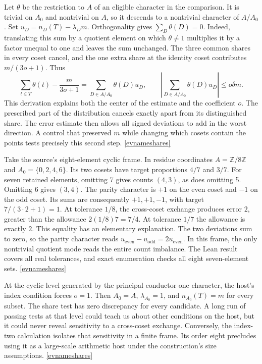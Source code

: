 \documentclass[11pt,letterpaper]{article}
\newcommand{\evref}[1]{\hyperlink{ev-#1}{\textsf{\small[\csname evname#1\endcsname]}}}
\begin{document}
Let \(\theta\) be the restriction to \(A\) of an eligible character in the comparison. It is trivial on \(A_0\) and nontrivial on \(A\), so it descends to a nontrivial character of \(A/A_0\). Set \(u_D=n_D(T)-\lambda_Dm\). Orthogonality gives \(\sum_D\theta(D)=0\). Indeed, translating this sum by a quotient element on which \(\theta\ne1\) multiplies it by a factor unequal to one and leaves the sum unchanged. The three common shares in every coset cancel, and the one extra share at the identity coset contributes \(m/(3o+1)\). Thus
\[
 \sum_{t\in T}\theta(t)-\frac{m}{3o+1}
      =\sum_{D\in A/A_0}\theta(D)u_D,\qquad
 \left|\sum_{D\in A/A_0}\theta(D)u_D\right|\leq o\delta m .
\]
This derivation explains both the center of the estimate and the coefficient \(o\). The prescribed part of the distribution cancels exactly apart from its distinguished share. The error estimate then allows all signed deviations to add in the worst direction. A control that preserved \(m\) while changing which cosets contain the points tests precisely this second step. \evref{shares}

Take the source's eight-element cyclic frame. In residue coordinates \(A=\mathbb Z/8\mathbb Z\) and \(A_0=\{0,2,4,6\}\). Its two cosets have target proportions \(4/7\) and \(3/7\). For seven retained elements, omitting 7 gives counts \((4,3)\), as does omitting 5. Omitting 6 gives \((3,4)\). The parity character is \(+1\) on the even coset and \(-1\) on the odd coset. Its sums are consequently \(+1,+1,-1\), with target \(7/(3\cdot2+1)=1\). At tolerance \(1/8\), the cross-coset exchange produces error \(2\), greater than the allowance \(2(1/8)7=7/4\). At tolerance \(1/7\) the allowance is exactly \(2\). This equality has an elementary explanation. The two deviations sum to zero, so the parity character reads \(u_{\mathrm{even}}-u_{\mathrm{odd}}=2u_{\mathrm{even}}\). In this frame, the only nontrivial quotient mode reads the entire count imbalance. The Lean result covers all real tolerances, and exact enumeration checks all eight seven-element sets. \evref{shares}

At the cyclic level generated by the principal conductor-one character, the host's index condition forces \(o=1\). Then \(A_0=A\), \(\lambda_{A_0}=1\), and \(n_{A_0}(T)=m\) for every subset. The share test has zero discrepancy for every candidate. A long run of passing tests at that level could teach us about other conditions on the host, but it could never reveal sensitivity to a cross-coset exchange. Conversely, the index-two calculation isolates that sensitivity in a finite frame. Its order eight precludes using it as a large-scale arithmetic host under the construction's size assumptions. \evref{shares}
\end{document}
